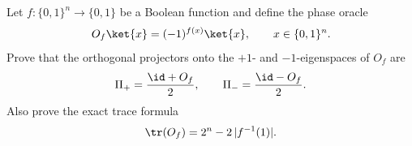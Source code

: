 Let $f:\{0,1\}^n\to\{0,1\}$ be a Boolean function and define the phase oracle
$$
    O_f\ket{x}=(-1)^{f(x)}\ket{x},\qquad x\in\{0,1\}^n .
$$
Prove that the orthogonal projectors onto the $+1$- and $-1$-eigenspaces of $O_f$ are
$$
    \Pi_+=\frac{\id+O_f}{2},\qquad
    \Pi_- =\frac{\id-O_f}{2}.
$$
Also prove the exact trace formula
$$
    \tr(O_f)=2^n-2\,|f^{-1}(1)|.
$$
